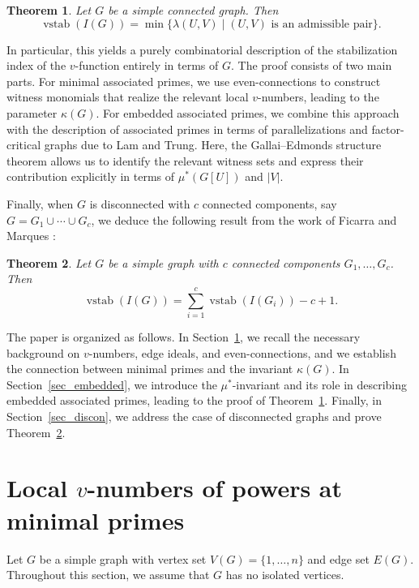 \documentclass[12pt,reqno,twoside]{amsart}
\newtheorem{thm}{\bf Theorem}[section]
\theoremstyle{definition}
\theoremstyle{plain}
\theoremstyle{remark}
\numberwithin{equation}{section}
\begin{document}
\begin{thm}\label{thm_main}
Let $G$ be a simple connected graph. Then
\[
\operatorname{vstab}(I(G)) = \min\{\lambda(U,V) \mid (U,V) \text{ is an admissible pair}\}.
\]
\end{thm}

In particular, this yields a purely combinatorial description of the stabilization index of the $v$-function entirely in terms of $G$. The proof consists of two main parts. For minimal associated primes, we use even-connections to construct witness monomials that realize the relevant local $v$-numbers, leading to the parameter $\kappa(G)$. For embedded associated primes, we combine this approach with the description of associated primes in terms of parallelizations and factor-critical graphs due to Lam and Trung. Here, the Gallai--Edmonds structure theorem allows us to identify the relevant witness sets and express their contribution explicitly in terms of $\mu^*(G[U])$ and $|V|$.

Finally, when $G$ is disconnected with $c$ connected components, say $G = G_1 \cup \cdots \cup G_c$, we deduce the following result from the work of Ficarra and Marques \cite{FM}:

\begin{thm}\label{thm_discon}
Let $G$ be a simple graph with $c$ connected components $G_1, \ldots, G_c$. Then
\[
\operatorname{vstab}(I(G)) = \sum_{i=1}^c \operatorname{vstab}(I(G_i)) - c + 1.
\]
\end{thm}

The paper is organized as follows. In Section~\ref{sec_minimal}, we recall the necessary background on $v$-numbers, edge ideals, and even-connections, and we establish the connection between minimal primes and the invariant $\kappa(G)$. In Section~\ref{sec_embedded}, we introduce the $\mu^*$-invariant and its role in describing embedded associated primes, leading to the proof of Theorem~\ref{thm_main}. Finally, in Section~\ref{sec_discon}, we address the case of disconnected graphs and prove Theorem~\ref{thm_discon}.

\section{Local $v$-numbers of powers at minimal primes}\label{sec_minimal} 
Let $G$ be a simple graph with vertex set $V(G) = \{1, \ldots, n\}$ and edge set $E(G)$. Throughout this section, we assume that $G$ has no isolated vertices.
\end{document}

